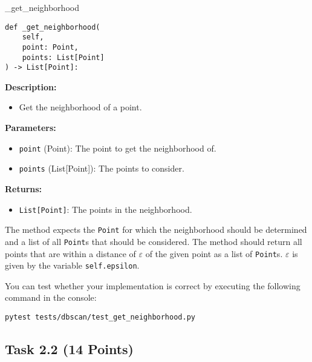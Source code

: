 \documentclass[
english,
smallborders
]{i6prcsht}
\newcommand{\points}[1]{\hfill \color{red}(#1 Points)\color{black}}
\begin{document}
\begin{functionbox}{\_get\_neighborhood}
	\begin{lstlisting}[numbers=none]
def _get_neighborhood(
    self, 
    point: Point, 
    points: List[Point]
) -> List[Point]:
\end{lstlisting}
	
	\textbf{Description:}
	\begin{itemize}[leftmargin=*,topsep=0pt]
		\item Get the neighborhood of a point.
	\end{itemize}
	
	\textbf{Parameters:}
	\begin{itemize}[leftmargin=*,topsep=0pt]
		\item \texttt{point} (Point): The point to get the neighborhood of.
		\item \texttt{points} (List[Point]): The points to consider.
	\end{itemize}
	
	\textbf{Returns:}
	\begin{itemize}[leftmargin=*,topsep=0pt]
		\item \texttt{List[Point]}: The points in the neighborhood.
	\end{itemize}
\end{functionbox}

\vspace*{0.5cm}

The method expects the \texttt{Point} for which the neighborhood should be determined and a list of all \texttt{Point}s that should be considered. The method should return all points that are within a distance of $\varepsilon$ of the given point as a list of \texttt{Point}s. $\varepsilon$ is given by the variable \texttt{self.epsilon}.

You can test whether your implementation is correct by executing the following command in the console:

\vspace*{0.3cm}

\begin{lstlisting}
pytest tests/dbscan/test_get_neighborhood.py
\end{lstlisting}

\newpage

\subsection*{Task 2.2 \points{14}}
\end{document}
